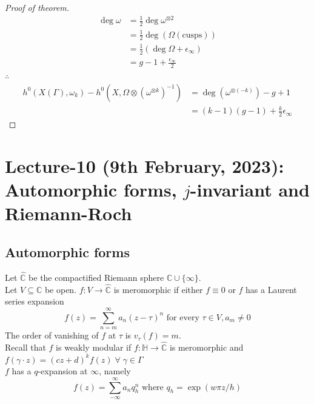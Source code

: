 \documentclass[oneside, 12pt]{scrbook}
\newcommand{\CC}{\mathbb C}
\theoremstyle{theorem}
\begin{document}
\begin{proof}[Proof of theorem]
\begin{align*}
\deg \omega &= \frac{1}{2} \deg \omega^{\otimes 2} \\
&= \frac{1}{2} \deg (\Omega(\text{cusps})) \\
&= \frac{1}{2} (\deg \Omega + \epsilon_{\infty}) \\
&= g-1 + \frac{\epsilon_{\infty}}{2}
\end{align*}
$\therefore$
\begin{align*}
h^{0}(X(\Gamma), \omega_{k}) - h^{0}(X, \Omega \otimes (\omega^{\otimes k})^{-1}) &= \deg (\omega^{\otimes (-k)}) - g + 1 \\
&= (k-1)(g-1) + \frac{k}{2} \epsilon_{\infty}
\end{align*}
\end{proof}


\chapter{Lecture-10 (9th February, 2023): Automorphic forms, $j$-invariant and Riemann-Roch}

\section{Automorphic forms}

Let $\widehat{\CC}$ be the compactified Riemann sphere $\CC \cup \{\infty\}$. \\

Let $V \subseteq \CC$ be open. $f: V \rightarrow \widehat{\CC}$ is meromorphic if either $f \equiv 0$ or $f$ has a Laurent series expansion 
\begin{equation}
f(z) = \sum_{n=m}^{\infty} a_{n} (z  - \tau)^n \text{ for every } \tau \in V , a_{m} \neq 0
\end{equation}
The order of vanishing of $f$ at $\tau$ is $v_{\tau}(f) = m$. \\

Recall that $f$ is weakly modular if $f: \mathbb{H} \rightarrow \widehat{\CC}$ is meromorphic and $f(\gamma \cdot z) = (cz+d)^k f(z) \; \forall \; \gamma \in \Gamma$ \\

$f$ has a $q$-expansion at $\infty$, namely 
\begin{equation}
f(z) = \sum_{-\infty}^{\infty} a_{n}q_{h}^n  \text{  where }q_{h} = \exp(w\pi z/h)
\end{equation}
\end{document}
